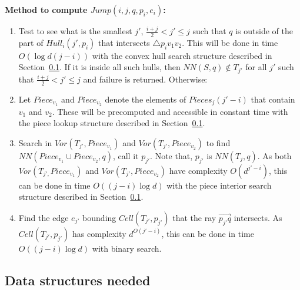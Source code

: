 \documentclass[12pt,a4paper,USenglish,cleveref, autoref, thm-restate]{article}
\newcommand{\ovar}[1]{\overrightarrow{#1}}
\newcommand{\Cell}{\mathit{Cell}}
\newcommand{\Piece}{\mathit{Piece}}
\newcommand{\Pieces}{\mathit{Pieces}}
\newcommand{\Hull}{\mathit{Hull}}
\newcommand{\NN}{\mathit{NN}}
\newcommand{\Voron}{\mathit{Vor}}
\newcommand{\ovar}[1]{\overrightarrow{#1}}
\newcommand{\Cell}{\mathit{Cell}}
\newcommand{\Piece}{\mathit{Piece}}
\newcommand{\Pieces}{\mathit{Pieces}}
\newcommand{\Hull}{\mathit{Hull}}
\newcommand{\NN}{\mathit{NN}}
\newcommand{\Voron}{\mathit{Vor}}
\newcommand{\ovar}[1]{\overrightarrow{#1}}
\newcommand{\Cell}{\mathit{Cell}}
\newcommand{\Piece}{\mathit{Piece}}
\newcommand{\Pieces}{\mathit{Pieces}}
\newcommand{\Hull}{\mathit{Hull}}
\newcommand{\NN}{\mathit{NN}}
\newcommand{\Voron}{\mathit{Vor}}
\begin{document}
\noindent \textbf{Method to compute $Jump(i,j,q,p_i,e_i)$:}
    \begin{enumerate}
        \item \label{jumpstep1} Test to see what is the smallest $j'$, $\frac{i+j}{2}< j'\leq j$ such that  $q$ is outside of the part of $\Hull_i(j',p_i)$ that intersects $\triangle p_iv_1v_2$. This will be done in time $O(\log d(j-i))$ with the convex hull search structure described in Section~\ref{sec:aux-datastr}. If it is inside all such hulls, then $\NN(S,q) \not \in T_{j'}$ for all $j'$ such that $\frac{i+j}{2}< j'\leq j$ and failure is returned. Otherwise:
        \item Let $\Piece_{v_1}$ and $\Piece_{v_2}$ denote the elements of $\Pieces_j(j'-i)$ that contain $v_1$ and $v_2$. These will be precomputed and accessible in constant time with the piece lookup  structure described in Section~\ref{sec:aux-datastr}.
        \item Search in $\Voron(T_{j'},\Piece_{v_1})$ and $\Voron(T_{j'},\Piece_{v_2})$ to find $\NN(\Piece_{v_1} \cup \Piece_{v_2},q)$, call it $p_{j'}$. Note that, $p_{j'}$ is $\NN(T_j,q)$.
         As both $\Voron(T_{j',}\Piece_{v_1})$ and $\Voron(T_{j'},\Piece_{v_2})$ have complexity $O(d^{j'-i})$, this can be done in time $O((j-i)\log d)$ 
         with the piece interior search  structure described in Section~\ref{sec:aux-datastr}.
        \item Find the edge $e_{j'}$ bounding $\Cell(T_{j'},p_{j'})$ that the ray $\ovar{p_{j'}q}$ intersects. As $\Cell(T_{j'},p_{j'})$ has complexity $d^{O(j'-i)}$, this can be done in time $O((j-i)\log d)$ with binary search.
    \end{enumerate}


\subsection{Data structures needed}
\label{sec:aux-datastr}
\end{document}
